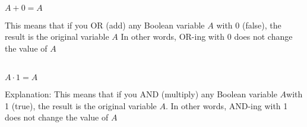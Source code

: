 \begin{ColorThemedBox}[1][2][title=Identity Law]\relax
	\begin{Items}

		\smallskip\\ $ A + 0 = A $

		 This means that if you OR (add) any Boolean variable $A$
		with 0 (false), the result is the original variable $A$
 		In other words, OR-ing with 0 does not change the value of $A$
		
			
		\smallskip\\ $ A \cdot 1 = A $

		 Explanation: This means that if you AND (multiply) any Boolean variable $A$with 1 (true),
			the result is the original variable $A$. In other words, AND-ing with 1 does not change the value of $A$\smallskip
	\end{Items}
\end{ColorThemedBox}
\smallskip\\
